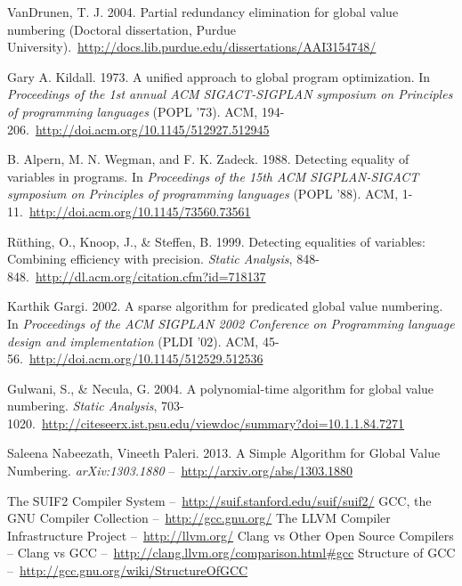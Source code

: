 \cleardoublepage
{}
{}
\begin{thebibliography}{99}

VanDrunen, T. J. 2004. Partial redundancy elimination for global value numbering (Doctoral dissertation, Purdue University).\ \url{http://docs.lib.purdue.edu/dissertations/AAI3154748/}

Gary A. Kildall. 1973. A unified approach to global program optimization. In \emph{Proceedings of the 1st annual ACM SIGACT-SIGPLAN symposium on Principles of programming languages} (POPL '73). ACM, 194-206.\ \url{http://doi.acm.org/10.1145/512927.512945}

B. Alpern, M. N. Wegman, and F. K. Zadeck. 1988. Detecting equality of variables in programs. In \emph{Proceedings of the 15th ACM SIGPLAN-SIGACT symposium on Principles of programming languages} (POPL '88). ACM, 1-11.\ \url{http://doi.acm.org/10.1145/73560.73561}

R\"uthing, O., Knoop, J., \& Steffen, B. 1999. Detecting equalities of variables: Combining efficiency with precision. \emph{Static Analysis}, 848-848.\ \url{http://dl.acm.org/citation.cfm?id=718137}

Karthik Gargi. 2002. A sparse algorithm for predicated global value numbering. In \emph{Proceedings of the ACM SIGPLAN 2002 Conference on Programming language design and implementation} (PLDI '02). ACM, 45-56.\ \url{http://doi.acm.org/10.1145/512529.512536}

Gulwani, S., \& Necula, G. 2004. A polynomial-time algorithm for global value numbering. \emph{Static Analysis}, 703-1020.\ \url{http://citeseerx.ist.psu.edu/viewdoc/summary?doi=10.1.1.84.7271}

Saleena Nabeezath, Vineeth Paleri. 2013. A Simple Algorithm for Global Value Numbering. \emph{arXiv:1303.1880} --\ \url{http://arxiv.org/abs/1303.1880}

The SUIF2 Compiler System --\ \url{http://suif.stanford.edu/suif/suif2/}
GCC, the GNU Compiler Collection --\ \url{http://gcc.gnu.org/}
The LLVM Compiler Infrastructure Project --\ \url{http://llvm.org/}
Clang vs Other Open Source Compilers -- Clang vs GCC --\ \url{http://clang.llvm.org/comparison.html#gcc}
Structure of GCC --\ \url{http://gcc.gnu.org/wiki/StructureOfGCC}


\end{thebibliography}

